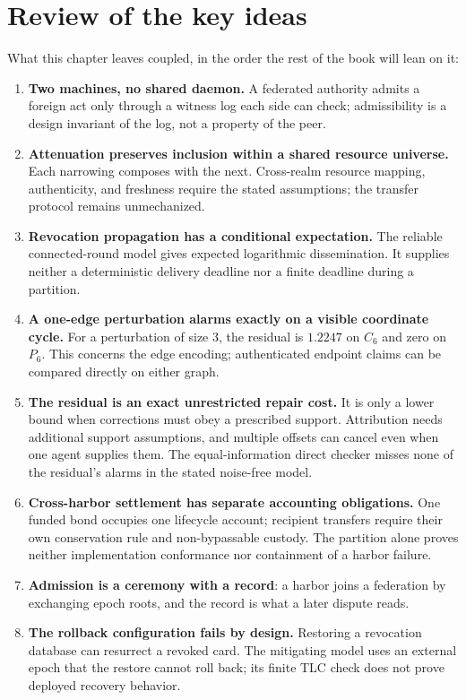\documentclass[11pt,a4paper]{article}
\theoremstyle{definition}
\theoremstyle{remark}
\begin{document}

\pdexercisepointer{\ref{ex:fh-correlated-equilibrium}}{\ref{ex:fh-synthesis}}{\pageref{ex:fh-correlated-equilibrium}}

\section*{Review of the key ideas}

What this chapter leaves coupled, in the order the rest of the book will lean on it:

\begin{enumerate}[leftmargin=1.6em,itemsep=2pt]
\item \textbf{Two machines, no shared daemon.} A federated authority admits a foreign act only through a witness log each side can check; admissibility is a design invariant of the log, not a property of the peer.
\item \textbf{Attenuation preserves inclusion within a shared resource universe.} Each narrowing composes with the next. Cross-realm resource mapping, authenticity, and freshness require the stated assumptions; the transfer protocol remains unmechanized.
\item \textbf{Revocation propagation has a conditional expectation.} The reliable connected-round model gives expected logarithmic dissemination. It supplies neither a deterministic delivery deadline nor a finite deadline during a partition.
\item \textbf{A one-edge perturbation alarms exactly on a visible coordinate cycle.} For a perturbation of size $3$, the residual is $1.2247$ on $C_6$ and zero on $P_6$. This concerns the edge encoding; authenticated endpoint claims can be compared directly on either graph.
\item \textbf{The residual is an exact unrestricted repair cost.} It is only a lower bound when corrections must obey a prescribed support. Attribution needs additional support assumptions, and multiple offsets can cancel even when one agent supplies them. The equal-information direct checker misses none of the residual's alarms in the stated noise-free model.
\item \textbf{Cross-harbor settlement has separate accounting obligations.} One funded bond occupies one lifecycle account; recipient transfers require their own conservation rule and non-bypassable custody. The partition alone proves neither implementation conformance nor containment of a harbor failure.
\item \textbf{Admission is a ceremony with a record}: a harbor joins a federation by exchanging epoch roots, and the record is what a later dispute reads.
\item \textbf{The rollback configuration fails by design.} Restoring a revocation database can resurrect a revoked card. The mitigating model uses an external epoch that the restore cannot roll back; its finite TLC check does not prove deployed recovery behavior.
\end{enumerate}
\end{document}
